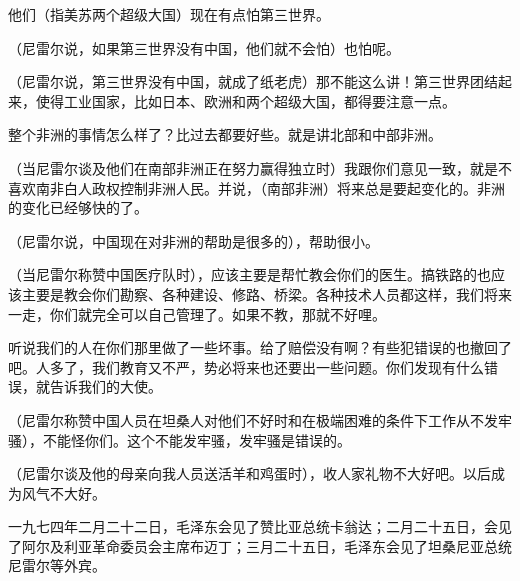 他们（指美苏两个超级大国）现在有点怕第三世界。

（尼雷尔说，如果第三世界没有中国，他们就不会怕）也怕呢。

（尼雷尔说，第三世界没有中国，就成了纸老虎）那不能这么讲！第三世界团结起来，使得工业国家，比如日本、欧洲和两个超级大国，都得要注意一点。

整个非洲的事情怎么样了？比过去都要好些。就是讲北部和中部非洲。

（当尼雷尔谈及他们在南部非洲正在努力赢得独立时）我跟你们意见一致，就是不喜欢南非白人政权控制非洲人民。并说，（南部非洲）将来总是要起变化的。非洲的变化已经够快的了。

（尼雷尔说，中国现在对非洲的帮助是很多的），帮助很小。

（当尼雷尔称赞中国医疗队时），应该主要是帮忙教会你们的医生。搞铁路的也应该主要是教会你们勘察、各种建设、修路、桥梁。各种技术人员都这样，我们将来一走，你们就完全可以自己管理了。如果不教，那就不好哩。

听说我们的人在你们那里做了一些坏事。给了赔偿没有啊？有些犯错误的也撤回了吧。人多了，我们教育又不严，势必将来也还要出一些问题。你们发现有什么错误，就告诉我们的大使。

（尼雷尔称赞中国人员在坦桑人对他们不好时和在极端困难的条件下工作从不发牢骚），不能怪你们。这个不能发牢骚，发牢骚是错误的。

（尼雷尔谈及他的母亲向我人员送活羊和鸡蛋时），收人家礼物不大好吧。以后成为风气不大好。

\begin{maonote}
一九七四年二月二十二日，毛泽东会见了赞比亚总统卡翁达；二月二十五日，会见了阿尔及利亚革命委员会主席布迈丁；三月二十五日，毛泽东会见了坦桑尼亚总统尼雷尔等外宾。
\end{maonote}
